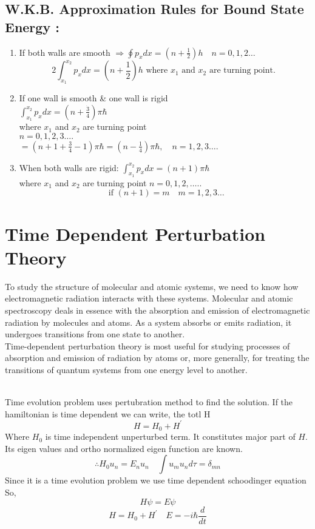 \subsection{ W.K.B. Approximation Rules for Bound State Energy :}
\begin{enumerate}
	\item  If both walls are smooth $\Rightarrow \oint p_{x} d x=\left(n+\frac{1}{2}\right) h \quad n=0,1,2 \ldots$
	$$
	2 \int_{x_{1}}^{x_{2}} p_{x} d x=\left(n+\frac{1}{2}\right) h \text { where } x_{1} \text { and } x_{2} \text { are turning point. }
	$$
	\item If one wall is smooth \& one wall is rigid \\
	$\int_{x_{1}}^{x_{2}} p_{x} d x=\left(n+\frac{\dot{3}}{4}\right) \pi \hbar \quad$\\
	 where $x_{1}$ and $x_{2}$ are turning point\\
	  $n=0,1,2,3 \ldots .$ \\
	  $=\left(n+1+\frac{3}{4}-1\right) \pi \hbar=\left(n-\frac{1}{4}\right) \pi \hbar, \quad n=1,2,3 \ldots .$
	  \item When both walls are rigid:
	  $\int_{x_{1}}^{x_{2}} p_{x} d x=(n+1) \pi \hbar \quad$ \\
	  where $x_{1}$ and $x_{2}$ are turning point $n=0,1,2, \ldots . .$
	  $$
	  \text { if }(n+1)=m \quad m=1,2,3 \ldots
	  $$
\end{enumerate}


\section{Time Dependent Perturbation Theory}
To study the structure of molecular and atomic systems, we need to know how electromagnetic radiation interacts with these systems. Molecular and atomic spectroscopy deals in essence with the absorption and emission of electromagnetic radiation by molecules and atoms. As a system absorbs or emits radiation, it undergoes transitions from one state to another.\\
Time-dependent perturbation theory is most useful for studying processes of absorption and emission of radiation by atoms or, more generally, for treating the transitions of quantum systems from one energy level to another.\\\\
\par Time evolution problem uses pertubration method to find the solution. If the hamiltonian is time dependent we can write, the totl H
$$H=H_0+H^\prime$$
Where $H_0$ is time independent unperturbed term. It constitutes major part of $H$.
Its eigen values and ortho normalized eigen function are known.
$$\therefore H_0u_n=E_n u_n\quad \int u_m u_n d\tau=\delta_{mn}$$
Since it is a time evolution problem we use time dependent schoodinger equation \\
So,
$$H\psi=E\psi$$
$$H=H_0+H^\prime\quad E=-i\hbar\frac{ d}{dt}$$

